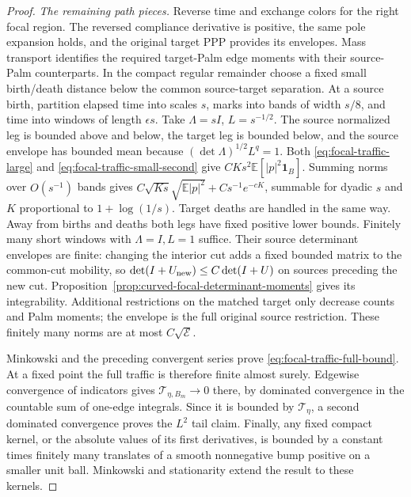 \documentclass[11pt,reqno]{amsart}
\theoremstyle{definition}
\theoremstyle{remark}
\numberwithin{equation}{section}
\newcommand{\E}{\mathbb E}
\begin{document}
\begin{proof}
\emph{The remaining path pieces.}
Reverse time and exchange colors for the right focal region. The
reversed compliance derivative is positive, the same pole expansion
holds, and the original target PPP provides its envelopes. Mass
transport identifies the required target-Palm edge moments with their
source-Palm counterparts.
In the compact regular remainder choose a fixed small birth/death
distance below the common source-target separation. At a source birth,
partition elapsed time into scales $s$, marks into bands of width $s/8$,
and time into windows of length $\epsilon s$. Take
$\Lambda=sI$, $L=s^{-1/2}$. The source normalized leg is bounded
above and below, the target leg is bounded below, and the source
envelope has bounded mean because $(\det\Lambda)^{1/2}L^q=1$.
Both \eqref{eq:focal-traffic-large} and
\eqref{eq:focal-traffic-small-second} give
$CKs^2\E[|p|^2\mathbf1_B]$. Summing norms over $O(s^{-1})$ bands
gives $C\sqrt{Ks}\sqrt{\E|p|^2}+Cs^{-1}e^{-cK}$, summable for
dyadic $s$ and $K$ proportional to $1+\log(1/s)$. Target deaths are
handled in the same way.
Away from births and deaths both legs have fixed positive lower
bounds. Finitely many short windows with $\Lambda=I,L=1$ suffice.
Their source determinant envelopes are finite: changing the interior
cut adds a fixed bounded matrix to the common-cut mobility, so
$\det(I+U_{\rm new})\le C\det(I+U)$ on sources preceding the new cut.
Proposition~\ref{prop:curved-focal-determinant-moments} gives its
integrability. Additional restrictions on the matched target only
decrease counts and Palm moments; the envelope is the full original
source restriction. These finitely many norms are at most
$C\sqrt{\mathcal E}$.

Minkowski and the preceding convergent series prove
\eqref{eq:focal-traffic-full-bound}. At a fixed point the full traffic
is therefore finite almost surely. Edgewise convergence of indicators
gives $\mathcal T_{\eta,B_m}\to0$ there, by dominated convergence in
the countable sum of one-edge integrals. Since it is bounded by
$\mathcal T_\eta$, a second dominated convergence proves the $L^2$ tail
claim. Finally, any fixed compact kernel, or the absolute values of
its first derivatives, is bounded by a constant times finitely many
translates of a smooth nonnegative bump positive on a smaller unit
ball. Minkowski and stationarity extend the result to these kernels.
\end{proof}
\end{document}
